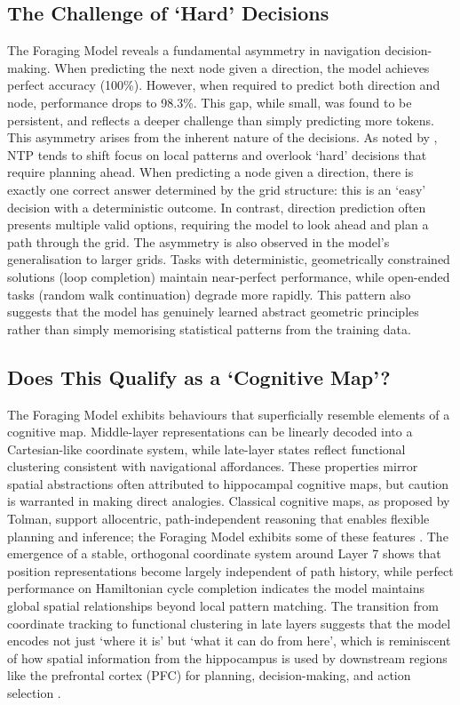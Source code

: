 \subsection{The Challenge of `Hard' Decisions}

The Foraging Model reveals a fundamental asymmetry in navigation decision-making. When predicting the next node given a direction, the model achieves perfect accuracy (100\%). However, when required to predict both direction and node, performance drops to 98.3\%. This gap, while small, was found to be persistent, and reflects a deeper challenge than simply predicting more tokens. This asymmetry arises from the inherent nature of the decisions. As noted by \cite{bachmann2024ntp}, NTP tends to shift focus on local patterns and overlook `hard' decisions that require planning ahead. When predicting a node given a direction, there is exactly one correct answer determined by the grid structure: this is an `easy' decision with a deterministic outcome. In contrast, direction prediction often presents multiple valid options, requiring the model to look ahead and plan a path through the grid. The asymmetry is also observed in the model's generalisation to larger grids. Tasks with deterministic, geometrically constrained solutions (loop completion) maintain near-perfect performance, while open-ended tasks (random walk continuation) degrade more rapidly. This pattern also suggests that the model has genuinely learned abstract geometric principles rather than simply memorising statistical patterns from the training data.


\subsection{Does This Qualify as a `Cognitive Map'?}
The Foraging Model exhibits behaviours that superficially resemble elements of a cognitive map. Middle-layer representations can be linearly decoded into a Cartesian-like coordinate system, while late-layer states reflect functional clustering consistent with navigational affordances. These properties mirror spatial abstractions often attributed to hippocampal cognitive maps, but caution is warranted in making direct analogies. Classical cognitive maps, as proposed by Tolman, support allocentric, path-independent reasoning that enables flexible planning and inference; the Foraging Model exhibits some of these features \citep{tolman1948cognitive}. The emergence of a stable, orthogonal coordinate system around Layer 7 shows that position representations become largely independent of path history, while perfect performance on Hamiltonian cycle completion indicates the model maintains global spatial relationships beyond local pattern matching. The transition from coordinate tracking to functional clustering in late layers suggests that the model encodes not just `where it is' but `what it can do from here', which is reminiscent of how spatial information from the hippocampus is used by downstream regions like the prefrontal cortex (PFC) for planning, decision-making, and action selection \citep{yu2015hippocampal}. 

